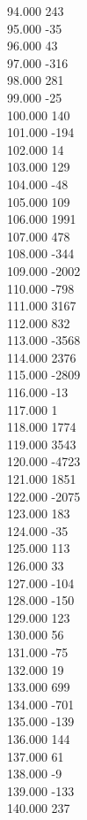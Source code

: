 { 94.000	243 \\
 95.000	-35 \\
 96.000	43 \\
 97.000	-316 \\
 98.000	281 \\
 99.000	-25 \\
 100.000	140 \\
 101.000	-194 \\
 102.000	14 \\
 103.000	129 \\
 104.000	-48 \\
 105.000	109 \\
 106.000	1991 \\
 107.000	478 \\
 108.000	-344 \\
 109.000	-2002 \\
 110.000	-798 \\
 111.000	3167 \\
 112.000	832 \\
 113.000	-3568 \\
 114.000	2376 \\
 115.000	-2809 \\
 116.000	-13 \\
 117.000	1 \\
 118.000	1774 \\
 119.000	3543 \\
 120.000	-4723 \\
 121.000	1851 \\
 122.000	-2075 \\
 123.000	183 \\
 124.000	-35 \\
 125.000	113 \\
 126.000	33 \\
 127.000	-104 \\
 128.000	-150 \\
 129.000	123 \\
 130.000	56 \\
 131.000	-75 \\
 132.000	19 \\
 133.000	699 \\
 134.000	-701 \\
 135.000	-139 \\
 136.000	144 \\
 137.000	61 \\
 138.000	-9 \\
 139.000	-133 \\
 140.000	237 \\
}
